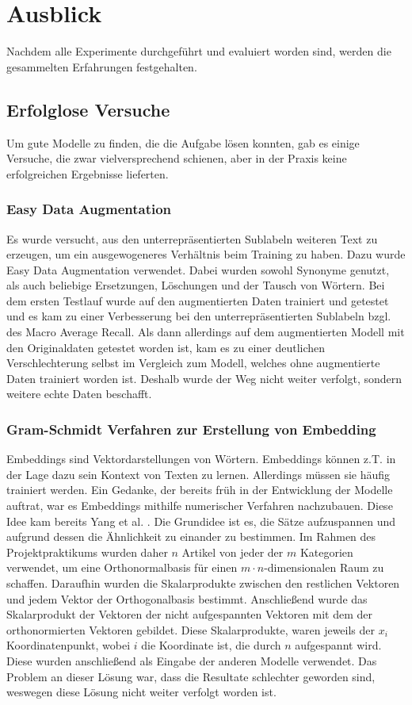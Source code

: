 \section{Ausblick}
\label{Ausblick}
Nachdem alle Experimente durchgeführt und evaluiert worden sind, werden die gesammelten Erfahrungen festgehalten.

\subsection{Erfolglose Versuche}
Um gute Modelle zu finden, die die Aufgabe lösen konnten, gab es einige Versuche, die zwar vielversprechend schienen, aber in der Praxis keine erfolgreichen Ergebnisse lieferten.

\subsubsection{Easy Data Augmentation}
\label{EDA}
Es wurde versucht, aus den unterrepräsentierten Sublabeln weiteren Text zu erzeugen, um ein ausgewogeneres Verhältnis beim Training zu haben. Dazu wurde Easy Data Augmentation \cite{Wei2019} verwendet. Dabei wurden sowohl Synonyme genutzt, als auch beliebige Ersetzungen, Löschungen und der Tausch von Wörtern. Bei dem ersten Testlauf wurde auf den augmentierten Daten trainiert und getestet und es kam zu einer Verbesserung bei den unterrepräsentierten Sublabeln bzgl. des Macro Average Recall. Als dann allerdings auf dem augmentierten Modell mit den Originaldaten getestet worden ist, kam es zu einer deutlichen Verschlechterung selbst im Vergleich zum Modell, welches ohne augmentierte Daten trainiert worden ist. Deshalb wurde der Weg nicht weiter verfolgt, sondern weitere echte Daten beschafft.

\subsubsection{Gram-Schmidt Verfahren zur Erstellung von Embedding}
Embeddings sind Vektordarstellungen von Wörtern. Embeddings können z.T. in der Lage dazu sein Kontext von Texten zu lernen. Allerdings müssen sie häufig trainiert werden. \cite{almeida2023wordembeddingssurvey} Ein Gedanke, der bereits früh in der Entwicklung der Modelle auftrat, war es Embeddings mithilfe numerischer Verfahren nachzubauen. Diese Idee kam bereits Yang et al. \cite{Yang2019}. Die Grundidee ist es, die Sätze aufzuspannen und aufgrund dessen die Ähnlichkeit zu einander zu bestimmen. Im Rahmen des Projektpraktikums wurden daher $n$ Artikel von jeder der $m$ Kategorien verwendet, um eine Orthonormalbasis für einen $m \cdot n$-dimensionalen Raum zu schaffen. Daraufhin wurden die Skalarprodukte zwischen den restlichen Vektoren und jedem Vektor der Orthogonalbasis bestimmt. Anschließend wurde das Skalarprodukt der Vektoren der nicht aufgespannten Vektoren mit dem der orthonormierten Vektoren gebildet. Diese Skalarprodukte, waren jeweils der $x_i$ Koordinatenpunkt, wobei $i$ die Koordinate ist, die durch $n$ aufgespannt wird. Diese wurden anschließend als Eingabe der anderen Modelle verwendet. Das Problem an dieser Lösung war, dass die Resultate schlechter geworden sind, weswegen diese Lösung nicht weiter verfolgt worden ist.

